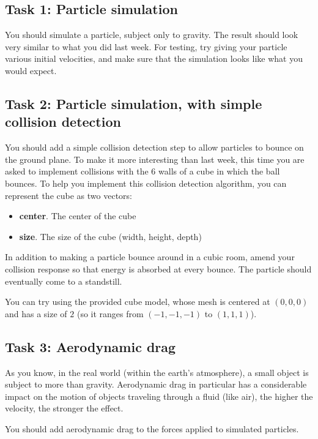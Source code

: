 \documentclass[12pt]{article}
\begin{document}
\subsection*{Task 1: Particle simulation}

You should simulate a particle, subject only to gravity. The result should look very similar to what you did last week. For testing, try giving your particle various initial velocities, and make sure that the simulation looks like what you would expect.

\subsection*{Task 2: Particle simulation, with simple collision detection}

You should add a simple collision detection step to allow particles to bounce on the ground plane. To make it more interesting than last week, this time you are asked to implement collisions with the 6 walls of a cube in which the ball bounces. To help you implement this collision detection algorithm, you can represent the cube as two vectors:
\begin{itemize}
\item \textbf{center}. The center of the cube
\item \textbf{size}. The size of the cube (width, height, depth)
\end{itemize}

In addition to making a particle bounce around in a cubic room, amend your collision response so that energy is absorbed at every bounce. The particle should eventually come to a standstill.

You can try using the provided cube model, whose mesh is centered at $(0,0,0)$ and has a size of $2$ (so it ranges from $(-1,-1,-1)$ to $(1,1,1)$).

\subsection*{Task 3: Aerodynamic drag}

As you know, in the real world (within the earth's atmosphere), a small object is subject to more than gravity. Aerodynamic drag in particular has a considerable impact on the motion of objects traveling through a fluid (like air), the higher the velocity, the stronger the effect.

You should add aerodynamic drag to the forces applied to simulated particles.
\end{document}
